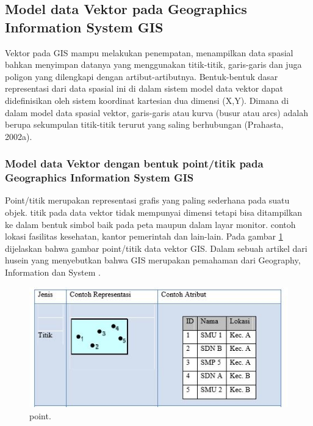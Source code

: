 \subsection{Model data Vektor pada Geographics Information System GIS}
Vektor  pada GIS mampu melakukan penempatan, menampilkan data spasial bahkan menyimpan datanya yang menggunakan titik-titik, garis-garis dan juga poligon yang dilengkapi dengan artibut-artibutnya. Bentuk-bentuk dasar representasi dari data spasial ini di dalam sistem model data vektor dapat didefinisikan oleh sistem koordinat kartesian dua dimensi (X,Y). Dimana di dalam model data spasial vektor, garis-garis atau kurva (busur atau arcs) adalah berupa sekumpulan titik-titik terurut yang saling berhubungan (Prahasta, 2002a). 

\subsubsection{Model data Vektor dengan bentuk point/titik pada Geographics Information System GIS}
Point/titik merupakan representasi grafis yang paling sederhana pada suatu objek. titik pada data vektor tidak mempunyai dimensi tetapi bisa ditampilkan ke dalam bentuk simbol baik pada peta maupun dalam layar monitor. contoh  lokasi fasilitas kesehatan, kantor pemerintah dan lain-lain. Pada gambar \ref{point} dijelaskan bahwa gambar point/titik data vektor GIS. Dalam sebuah artikel dari husein yang menyebutkan bahwa  GIS merupakan pemahaman dari
Geography, Information dan System \cite{widiatmoko2009aplikasi}.
\begin{figure}[ht]
	\centerline{\includegraphics[width=1\textwidth]{figures/point.JPG}}
	\caption{point.}
	\label{point}
	\end{figure}

